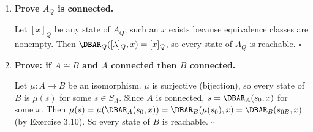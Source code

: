 \begin{enumerate}[{3.}1.]
\begin{enumerate}
\item Homomorphism $A_R\to A_Q$: Define $\mu([x]_R)=[x]_Q$ (well-defined since $R$ refines $Q$: $[x]_R=[y]_R\Rightarrow x R y\Rightarrow x Q y\Rightarrow[x]_Q=[y]_Q$). Check: $\mu(s_{0,R})=\mu([\lambda]_R)=[\lambda]_Q=s_{0,Q}$. $\mu(\delta_R([x]_R,a))=\mu([xa]_R)=[xa]_Q=\delta_Q([x]_Q,a)=\delta_Q(\mu([x]_R),a)$. $[x]_R\in F_R\Leftrightarrow x\in L\Leftrightarrow[x]_Q\in F_Q\Leftrightarrow\mu([x]_R)\in F_Q$.

\item Not in general. Take $\Sigma=\{\pmb{a}\}$, let
\[
[\lambda]_Q=\{\lambda\}, \qquad [\pmb{a}]_Q=\{x\in\Sigma^*:|x|\geq 1\},
\]
and let $R$ refine $Q$ by splitting the nonempty strings according to parity:
\[
[\lambda]_R=\{\lambda\},\qquad
[\pmb{a}]_R=\{x:|x|\text{ is odd}\},\qquad
[\pmb{aa}]_R=\{x:|x|\text{ is even and }|x|\geq 2\}.
\]
Let $L=\{\lambda\}$, which is a union of $Q$-classes. Then $A_Q$ has two states,
$q_0=[\lambda]_Q$ (start and final) and $q_1=[\pmb{a}]_Q$, with
\[
\delta_Q(q_0,\pmb{a})=q_1,\qquad \delta_Q(q_1,\pmb{a})=q_1.
\]
The DFA $A_R$ has three states, $r_0=[\lambda]_R$ (start and final),
$r_1=[\pmb{a}]_R$, and $r_2=[\pmb{aa}]_R$, with
\[
\delta_R(r_0,\pmb{a})=r_1,\qquad
\delta_R(r_1,\pmb{a})=r_2,\qquad
\delta_R(r_2,\pmb{a})=r_1.
\]

Assume there is a homomorphism $\psi:A_Q\to A_R$. Since start states must map to
start states, $\psi(q_0)=r_0$. Then
\[
\psi(q_1)=\psi(\delta_Q(q_0,\pmb{a}))
        =\delta_R(\psi(q_0),\pmb{a})
        =\delta_R(r_0,\pmb{a})
        =r_1.
\]
But also
\[
\psi(q_1)=\psi(\delta_Q(q_1,\pmb{a}))
        =\delta_R(\psi(q_1),\pmb{a})
        =\delta_R(r_1,\pmb{a})
        =r_2,
\]
which is impossible. Therefore there need not be a homomorphism from $A_Q$ to
$A_R$.
\end{enumerate}

\item \textbf{Prove $A_Q$ is connected.}

Let $[x]_Q$ be any state of $A_Q$; such an $x$ exists because equivalence classes are nonempty. Then $\DBAR_Q([\lambda]_Q,x)=[x]_Q$, so every state of $A_Q$ is reachable. $\square$

\item \textbf{Prove: if $A\cong B$ and $A$ connected then $B$ connected.}

Let $\mu: A\to B$ be an isomorphism. $\mu$ is surjective (bijection), so every state of $B$ is $\mu(s)$ for some $s\in S_A$. Since $A$ is connected, $s=\DBAR_A(s_0,x)$ for some $x$. Then $\mu(s)=\mu(\DBAR_A(s_0,x))=\DBAR_B(\mu(s_0),x)=\DBAR_B(s_{0B},x)$ (by Exercise 3.10). So every state of $B$ is reachable. $\square$


\end{enumerate}
